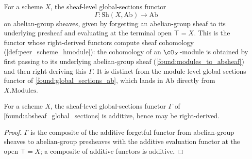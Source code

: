 \begin{definition}
  \label{found:absheaf_global_sections}
  For a scheme \(X\), the sheaf-level global-sections functor
  \[
    \Gamma:\mathrm{Sh}(X,\mathrm{Ab})\to\mathrm{Ab}
  \]
  on abelian-group sheaves, given by forgetting an abelian-group sheaf to its
  underlying presheaf and evaluating at the terminal open \(\top=X\).  This is the
  functor whose right-derived functors compute sheaf cohomology
  (\cref{def:peer_scheme_hmodule}): the cohomology of an \(\cO_X\)-module is
  obtained by first passing to its underlying abelian-group sheaf
  (\cref{found:modules_to_absheaf}) and then right-deriving this \(\Gamma\).  It
  is distinct from the module-level global-sections functor of
  \cref{found:global_sections_ab}, which lands in \(\mathrm{Ab}\) directly from
  \(X.\mathrm{Modules}\).
\end{definition}

\begin{lemma}
  \label{found:absheaf_global_sections_additive}
  For a scheme \(X\), the sheaf-level global-sections functor \(\Gamma\) of
  \cref{found:absheaf_global_sections} is additive, hence may be right-derived.
\end{lemma}

\begin{proof}
  \leanok
  \(\Gamma\) is the composite of the additive forgetful functor from
  abelian-group sheaves to abelian-group presheaves with the additive evaluation
  functor at the open \(\top=X\); a composite of additive functors is additive.
\end{proof}

